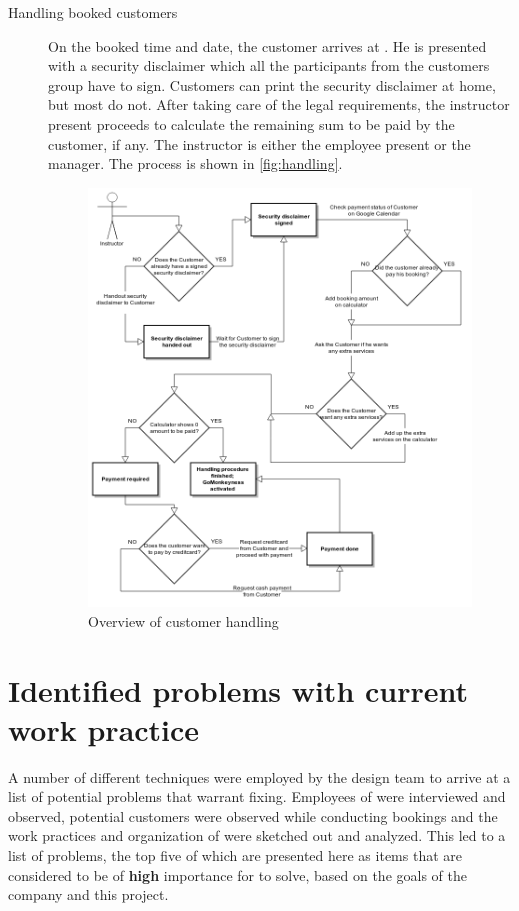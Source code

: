 \begin{description}
\item[Handling booked customers]
On the booked time and date, the customer arrives at \gomonkey{}. He is presented with a security disclaimer
which all the participants from the customers group have to sign. Customers can print the security disclaimer 
at home, but most do not. After taking care of the legal requirements, the instructor present proceeds to
calculate the remaining sum to be paid by the customer, if any. The instructor is either the employee present
or the manager. The process is shown in \autoref{fig:handling}. 

\begin{figure}[htbp]
    \centering
        \includegraphics[width=\textwidth]{figures/handling.png}
            \caption{Overview of customer handling}
        \label{fig:handling}
\end{figure}
\end{description}

\section{Identified problems with current work practice}
A number of different techniques were employed by the design team to arrive at a
list of potential problems that warrant fixing. Employees of \gomonkey{} were
interviewed and observed, potential customers were observed while conducting
bookings and the work practices and organization of \gomonkey{} were sketched out
and analyzed. This led to a list of problems, the top five of which are
presented here as items that are considered to be of \textbf{high} importance
for \gomonkey{} to solve, based on the goals of the company and this project.

